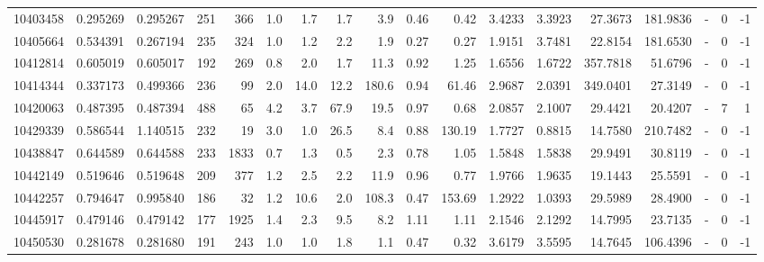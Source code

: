 \begin{tabular}{rrrrrrrrrrrrrrrlrr}
  10403458 & 0.295269 &   0.295267 &  251 &  366 &      1.0 &      1.7 &     1.7 &      3.9 &       0.46 &        0.42 &  3.4233 &  3.3923 &   27.3673 &  181.9836 &             - &        0 &         -1 \\
  10405664 & 0.534391 &   0.267194 &  235 &  324 &      1.0 &      1.2 &     2.2 &      1.9 &       0.27 &        0.27 &  1.9151 &  3.7481 &   22.8154 &  181.6530 &             - &        0 &         -1 \\
  10412814 & 0.605019 &   0.605017 &  192 &  269 &      0.8 &      2.0 &     1.7 &     11.3 &       0.92 &        1.25 &  1.6556 &  1.6722 &  357.7818 &   51.6796 &             - &        0 &         -1 \\
  10414344 & 0.337173 &   0.499366 &  236 &   99 &      2.0 &     14.0 &    12.2 &    180.6 &       0.94 &       61.46 &  2.9687 &  2.0391 &  349.0401 &   27.3149 &             - &        0 &         -1 \\
  10420063 & 0.487395 &   0.487394 &  488 &   65 &      4.2 &      3.7 &    67.9 &     19.5 &       0.97 &        0.68 &  2.0857 &  2.1007 &   29.4421 &   20.4207 &             - &        7 &          1 \\
  10429339 & 0.586544 &   1.140515 &  232 &   19 &      3.0 &      1.0 &    26.5 &      8.4 &       0.88 &      130.19 &  1.7727 &  0.8815 &   14.7580 &  210.7482 &             - &        0 &         -1 \\
  10438847 & 0.644589 &   0.644588 &  233 & 1833 &      0.7 &      1.3 &     0.5 &      2.3 &       0.78 &        1.05 &  1.5848 &  1.5838 &   29.9491 &   30.8119 &             - &        0 &         -1 \\
  10442149 & 0.519646 &   0.519648 &  209 &  377 &      1.2 &      2.5 &     2.2 &     11.9 &       0.96 &        0.77 &  1.9766 &  1.9635 &   19.1443 &   25.5591 &             - &        0 &         -1 \\
  10442257 & 0.794647 &   0.995840 &  186 &   32 &      1.2 &     10.6 &     2.0 &    108.3 &       0.47 &      153.69 &  1.2922 &  1.0393 &   29.5989 &   28.4900 &             - &        0 &         -1 \\
  10445917 & 0.479146 &   0.479142 &  177 & 1925 &      1.4 &      2.3 &     9.5 &      8.2 &       1.11 &        1.11 &  2.1546 &  2.1292 &   14.7995 &   23.7135 &             - &        0 &         -1 \\
  10450530 & 0.281678 &   0.281680 &  191 &  243 &      1.0 &      1.0 &     1.8 &      1.1 &       0.47 &        0.32 &  3.6179 &  3.5595 &   14.7645 &  106.4396 &             - &        0 &         -1 \\

\end{tabular}
